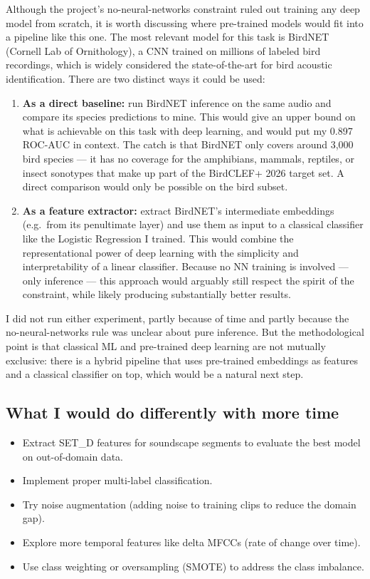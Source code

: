 \documentclass[11pt,a4paper]{article}
\begin{document}
Although the project's no-neural-networks constraint ruled out training any deep model from scratch, it is worth discussing where pre-trained models would fit into a pipeline like this one. The most relevant model for this task is BirdNET (Cornell Lab of Ornithology), a CNN trained on millions of labeled bird recordings, which is widely considered the state-of-the-art for bird acoustic identification. There are two distinct ways it could be used:

\begin{enumerate}
    \item \textbf{As a direct baseline:} run BirdNET inference on the same audio and compare its species predictions to mine. This would give an upper bound on what is achievable on this task with deep learning, and would put my 0.897 ROC-AUC in context. The catch is that BirdNET only covers around 3,000 bird species — it has no coverage for the amphibians, mammals, reptiles, or insect sonotypes that make up part of the BirdCLEF+ 2026 target set. A direct comparison would only be possible on the bird subset.
    \item \textbf{As a feature extractor:} extract BirdNET's intermediate embeddings (e.g.\ from its penultimate layer) and use them as input to a classical classifier like the Logistic Regression I trained. This would combine the representational power of deep learning with the simplicity and interpretability of a linear classifier. Because no NN training is involved — only inference — this approach would arguably still respect the spirit of the constraint, while likely producing substantially better results.
\end{enumerate}

I did not run either experiment, partly because of time and partly because the no-neural-networks rule was unclear about pure inference. But the methodological point is that classical ML and pre-trained deep learning are not mutually exclusive: there is a hybrid pipeline that uses pre-trained embeddings as features and a classical classifier on top, which would be a natural next step.

\subsection{What I would do differently with more time}

\begin{itemize}
    \item Extract SET\_D features for soundscape segments to evaluate the best model on out-of-domain data.
    \item Implement proper multi-label classification.
    \item Try noise augmentation (adding noise to training clips to reduce the domain gap).
    \item Explore more temporal features like delta MFCCs (rate of change over time).
    \item Use class weighting or oversampling (SMOTE) to address the class imbalance.
\end{itemize}
\end{document}
